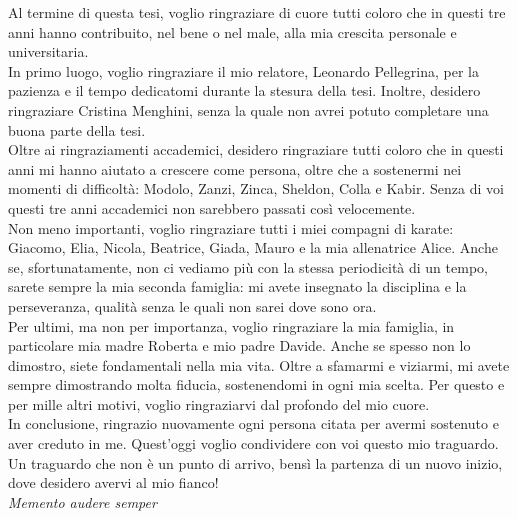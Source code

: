 Al termine di questa tesi, voglio ringraziare di cuore tutti coloro che in questi tre anni 
hanno contribuito, nel bene o nel male, alla mia crescita personale e universitaria. 
\\
In primo luogo, voglio ringraziare il mio relatore, Leonardo Pellegrina, per la pazienza e il 
tempo dedicatomi durante la stesura della tesi. Inoltre, desidero ringraziare Cristina Menghini, 
senza la quale non avrei potuto completare una buona parte della tesi.
\\ 
Oltre ai ringraziamenti accademici, desidero ringraziare tutti coloro che in questi anni mi hanno aiutato a
crescere come persona, oltre che a sostenermi nei momenti di difficoltà: Modolo, Zanzi, Zinca, Sheldon, Colla e Kabir. 
Senza di voi questi tre anni accademici non sarebbero passati così velocemente. 
\\
Non meno importanti, voglio ringraziare tutti i miei compagni di karate: Giacomo, Elia, Nicola, Beatrice, 
Giada, Mauro e la mia allenatrice Alice. 
Anche se, sfortunatamente, non ci vediamo più con la stessa periodicità di un tempo, sarete sempre 
la mia seconda famiglia: mi avete insegnato la disciplina e la perseveranza, qualità senza le quali non
sarei dove sono ora.
\\ 
Per ultimi, ma non per importanza, voglio ringraziare la mia famiglia, in particolare mia madre Roberta
e mio padre Davide. Anche se spesso non lo dimostro, siete fondamentali nella mia vita. Oltre a sfamarmi 
e viziarmi, mi avete sempre dimostrando molta fiducia, sostenendomi in ogni mia scelta. 
Per questo e per mille altri motivi, voglio ringraziarvi dal profondo del mio cuore.
\\ 
In conclusione, ringrazio nuovamente ogni persona citata per avermi sostenuto e aver creduto in me. 
Quest'oggi voglio condividere con voi questo mio traguardo.
Un traguardo che non è un punto di arrivo, bensì la partenza di un nuovo inizio, dove desidero avervi al mio fianco!\\
\emph{Memento audere semper}
